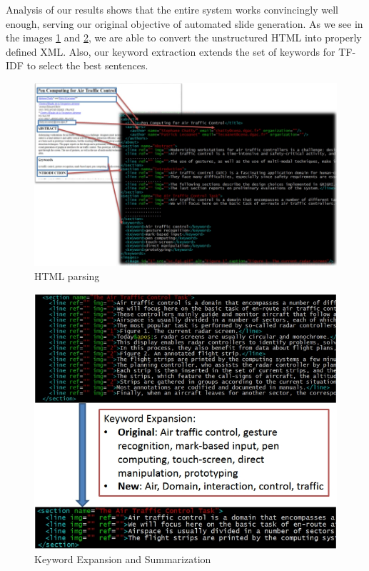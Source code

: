 Analysis of our results shows that the entire system works convincingly well enough,
serving our original objective of automated slide generation.
As we see in the images \ref{fig:parse1} and \ref{fig:sum1}, we are able to convert the 
unstructured HTML into properly defined XML. Also, our keyword extraction extends the set
of keywords for TF-IDF to select the best sentences.

\begin{figure}
\begin{center}
\includegraphics[width=\linewidth]{Slide6.jpg}
\end{center}
   \caption{HTML parsing}
\label{fig:parse1}
\end{figure}

\begin{figure}
\begin{center}
\includegraphics[width=\linewidth]{Slide7.jpg}
\end{center}
   \caption{Keyword Expansion and Summarization}
\label{fig:sum1}
\end{figure}